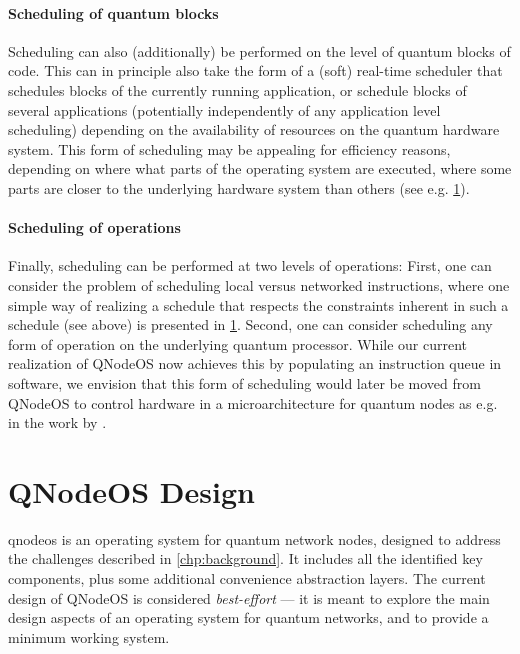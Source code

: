 \paragraph{Scheduling of quantum blocks}

Scheduling can also (additionally) be performed on the level of quantum blocks of code. This can in
principle also take the form of a (soft) real-time scheduler that schedules blocks of the currently
running application, or schedule blocks of several applications (potentially independently of any
application level scheduling) depending on the availability of resources on the quantum hardware
system. This form of scheduling may be appealing for efficiency reasons, depending on where what
parts of the operating system are executed, where some parts are closer to the underlying hardware
system than others (see e.g. \cref{sec:arch:design}).

\paragraph{Scheduling of operations}

Finally, scheduling can be performed at two levels of operations: First, one can consider the
problem of scheduling local versus networked instructions, where one simple way of realizing a
schedule that respects the constraints inherent in such a schedule (see above) is presented in
\cref{sec:arch:design}. Second, one can consider scheduling any form of operation on the underlying
quantum processor. While our current realization of QNodeOS now achieves this by populating an
instruction queue in software, we envision that this form of scheduling would later be moved from
QNodeOS to control hardware in a microarchitecture for quantum nodes as e.g. in the work by
\textcite{fu_2017_microarch}.

\section{QNodeOS Design}
\label{sec:arch:design}

\acrshort{qnodeos} is an operating system for quantum network nodes, designed to address the
challenges described in \cref{chp:background}. It includes all the identified key components, plus
some additional convenience abstraction layers. The current design of QNodeOS is considered
\emph{best-effort} --- it is meant to explore the main design aspects of an operating system for
quantum networks, and to provide a minimum working system.

